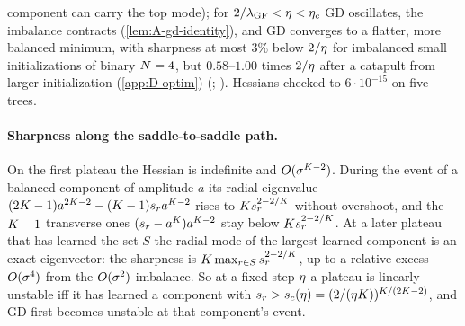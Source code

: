 component can carry the top mode); for $2/\lambda_{\rm GF}<\eta<\eta_c$ GD oscillates, the imbalance contracts
(\cref{lem:A-gd-identity}), and GD converges to a flatter, more balanced minimum, with sharpness at most $3\%$
below $2/\eta$ for imbalanced small initializations of binary $N=4$, but $0.58$--$1.00$ times $2/\eta$ after a
catapult from larger initialization (\cref{app:D-optim}) (\empirical; ). Hessians checked to $6\cdot10^{-15}$ on five trees.

\paragraph{Sharpness along the saddle-to-saddle path.} \derived{} \newresult{} On the first plateau the Hessian
is indefinite and $O(\sigma^{K-2})$. During the event of a balanced component of amplitude $a$ its radial
eigenvalue $(2K-1)a^{2K-2}-(K-1)s_{r}a^{K-2}$ rises to $Ks_{r}^{2-2/K}$ without overshoot, and the $K-1$
transverse ones $(s_{r}-a^K)a^{K-2}$ stay below $Ks_{r}^{2-2/K}$. At a later plateau that has learned the set
$S$ the radial mode of the largest learned component is an exact eigenvector: the sharpness is
$K\max_{r\in S}s_{r}^{2-2/K}$, up to a relative excess $O(\sigma^4)$ from the $O(\sigma^2)$ imbalance. So at a fixed step
$\eta$ a plateau is linearly unstable iff it has learned a component with $s_{r}>s_c(\eta)=(2/(\eta K))^{K/(2K-2)}$,
and GD first becomes unstable at that component's event.

